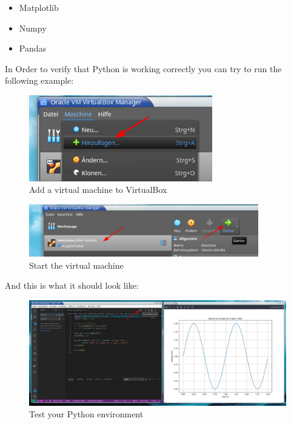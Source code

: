 \begin{itemize}
    \item Matplotlib
    \item Numpy
    \item Pandas
\end{itemize}

In Order to verify that Python is working correctly you can try to run the following example:

\vspace{1cm}
\begin{tcolorbox}[enhanced jigsaw,breakable,pad at break*=1mm,
    colback=blue!5!white,colframe=babyblueeyes,title=Test Python environment,
    watermark color=white]
    
\end{tcolorbox}

\begin{figure}[h!]
    \centering
    \includegraphics[width=8cm]{Figures/virtual_box1.png}
    \caption{Add a virtual machine to VirtualBox}
\end{figure}

\begin{figure}[h!]
    \centering
    \includegraphics[width=10cm]{Figures/virtual_box2.png}
    \caption{Start the virtual machine}
\end{figure}

\newpage

And this is what it should look like:

\vspace{1cm}

\begin{figure}[h!]
    \centering
    \includegraphics[width=18cm]{Figures/vs_code1.png}
    \caption{Test your Python environment}
\end{figure}
